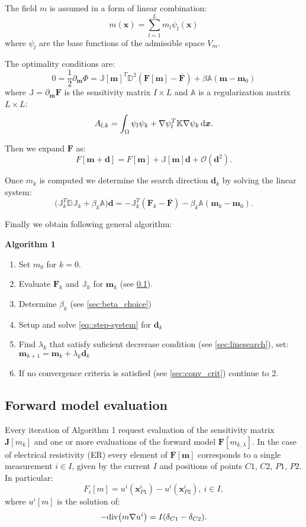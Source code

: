 \documentclass[a4paper, 12pt]{book}
\theoremstyle{definition}
\def\div{{\rm div}}
\def\grad{\nabla}
\def\d{\,{\rm d}}               %
\def\vc#1{\mathbf{\boldsymbol{#1}}}     %
\def\tn#1{{\mathbb{#1}}}    %
\def\prtl{\partial}                                        %
\begin{document}
The field $m$ is assumed in a form of linear combination:
\[
    m(\vc x) = \sum_{l=1}^L m_l \psi_l(\vc x)
\]
where $\psi_l$ are the base functions of the admissible space  $V_{m}$.

The optimality conditions are:
\[
   0  = \frac12\prtl_{\vc m} \Phi = \tn J[\vc m]^T \tn D^2 (\vc F[\vc m] - \overline{\vc F}) + \beta \tn A (\vc m - \vc m_0)
\]
where $\tn J=\prtl_{\vc m} \vc F$ is the sensitivity matrix $I\times L$ and $\tn A$ is a regularization matrix $L\times L$:
\[
   A_{l, k} = \int_\Omega \psi_l \psi_k + \grad \psi_l^T \tn K \grad \psi_k \d \vc x.
\]


Then we expand $\vc F$ as:
\[
    F[\vc m  + \vc d] = F[\vc m] + \tn J[\vc m] \vc d + \mathcal O(\vc d^2).
\]

Once $m_k$ is computed we determine the search direction $\vc d_{k}$ by solving the linear system:
\begin{equation}
   \label{eq::step-system}
   \Big(\tn J_k^T \tn D \tn J_k + \beta_k \tn A \Big) \vc d =
   -\tn J_k^T(\vc F_k - \overline{\vc F}) - \beta_k \tn A (\vc m_k - \vc m_0).
\end{equation}

Finally we obtain following general algorithm:

{\bf Algorithm 1}
\begin{enumerate}
 \item Set $m_0$ for $k=0$.
 \item Evaluate $\vc F_k$ and $\tn J_k$ for $\vc m_k$ (see \ref{sec:evaluation}).
 \item Determine $\beta_k$ (see \ref{sec:beta_choice})
 \item Setup and solve \eqref{eq::step-system} for $\vc d_k$
 \item Find $\lambda_k$ that satisfy suficient decrerase condition (see \ref{sec:linesearch}), set:
    $\vc m_{k+1} = \vc m_k + \lambda_k \vc d_k$
 \item If no convergence criteria is satisfied (see \ref{sec:conv_crit}) continue to 2.
\end{enumerate}

\subsection{Forward model evaluation}
\label{sec:evaluation}
Every iteration of Algorithm 1 request evaluation of the sensitivity matrix $\vc J[m_k]$ and one or more evaluations of
the forward model $\vc F[m_{k,\lambda}]$. In the case of electrical resistivity (ER) every element of $\vc F[\vc m]$
corresponds to a single measurement $i \in I$, given by the current $I$ and positions of points $C1$, $C2$, $P1$, $P2$.
In particular:
\[
    F_i[m] = u^i(\vc x^i_{P1}) - u^i(\vc x^i_{P2}),\ i\in I,
\]
where $u^i[m]$ is the solution of:
\[
  -\div \big(m \grad u^i \big) = I (\delta_{C1} - \delta_{C2}).
\]
\end{document}
